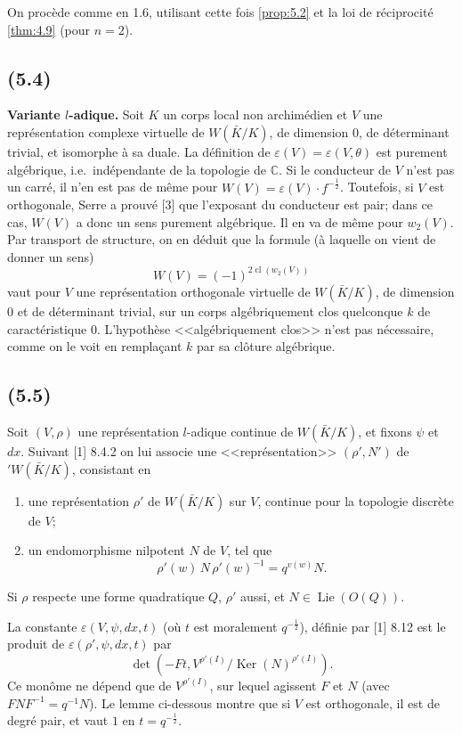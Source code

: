 \documentclass[11pt]{amsart}
\theoremstyle{plain}
\theoremstyle{definition}
\DeclareMathOperator{\Ker}{Ker}
\DeclareMathOperator{\cl}{cl}
\DeclareMathOperator{\Lie}{Lie}
\newcommand{\C}{\mathbb{C}}
\begin{document}
On proc\`ede comme en 1.6, utilisant cette fois \ref{prop:5.2} et la loi de r\'eciprocit\'e \ref{thm:4.9} (pour $n=2$).

\subsection{(5.4)}
\textbf{Variante $l$-adique.} Soit $K$ un corps local non archim\'edien et $V$ une repr\'esentation complexe virtuelle de $W(\bar K/K)$, de dimension $0$, de d\'eterminant trivial, et isomorphe \`a sa duale. La d\'efinition de $\varepsilon(V)=\varepsilon(V,\theta)$ est purement alg\'ebrique, i.e.~ind\'ependante de la topologie de $\C$. Si le conducteur de $V$ n'est pas un carr\'e, il n'en est pas de m\^eme pour $W(V)=\varepsilon(V)\cdot f^{-\frac12}$. Toutefois, si $V$ est orthogonale, Serre a prouv\'e [3] que l'exposant du conducteur est pair; dans ce cas, $W(V)$ a donc un sens purement alg\'ebrique. Il en va de m\^eme pour $w_2(V)$. Par transport de structure, on en d\'eduit que la formule (\`a laquelle on vient de donner un sens)
\begin{equation}\label{eq:5.3.1}
W(V)=(-1)^{2\cl(w_2(V))}
\end{equation}
vaut pour $V$ une repr\'esentation orthogonale virtuelle de $W(\bar K/K)$, de dimension $0$ et de d\'eterminant trivial, sur un corps alg\'ebriquement clos quelconque $k$ de caract\'eristique $0$. L'hypoth\`ese <<alg\'ebriquement clos>> n'est pas n\'ecessaire, comme on le voit en rempla\c{c}ant $k$ par sa cl\^oture alg\'ebrique.

\subsection{(5.5)}
Soit $(V,\rho)$ une repr\'esentation $l$-adique continue de $W(\bar K/K)$, et fixons $\psi$ et $dx$. Suivant [1] 8.4.2 on lui associe une <<repr\'esentation>> $(\rho',N')$ de $'W(\bar K/K)$, consistant en
\begin{enumerate}
\item[(a)] une repr\'esentation $\rho'$ de $W(\bar K/K)$ sur $V$, continue pour la topologie discr\`ete de $V$;
\item[(b)] un endomorphisme nilpotent $N$ de $V$, tel que
\[
\rho'(w)\,N\,\rho'(w)^{-1}=q^{v(w)}N.
\]
\end{enumerate}
Si $\rho$ respecte une forme quadratique $Q$, $\rho'$ aussi, et $N\in\Lie(O(Q))$.

La constante $\varepsilon(V,\psi,dx,t)$ (o\`u $t$ est moralement $q^{-\frac12}$), d\'efinie par [1] 8.12 est le produit de $\varepsilon(\rho',\psi,dx,t)$ par
\[
\det(-Ft,V^{\rho'(I)}/\Ker(N)^{\rho'(I)}).
\]
Ce mon\^ome ne d\'epend que de $V^{\rho'(I)}$, sur lequel agissent $F$ et $N$ (avec $FNF^{-1}=q^{-1}N$). Le lemme ci-dessous montre que si $V$ est orthogonale, il est de degr\'e pair, et vaut $1$ en $t=q^{-\frac12}$.
\end{document}
